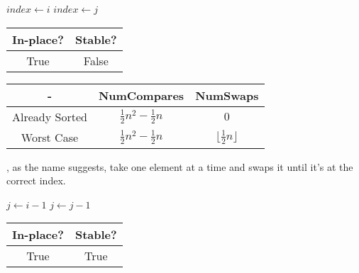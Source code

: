 \noindent \hrulefill
\begin{algorithmic}[1]
   
    \State $index \gets i$
          \State $index \gets j$
        \EndIf
      \EndFor
        \State {} 
      \EndIf
    \EndFor
    \State {}
  \EndFunction
\end{algorithmic}
\noindent \hrulefill

\begin{center}
  \begin{tabular}{ | c | c | }
    \hline
    In-place? & Stable? \\
    \hline
    True & False \\
    \hline
  \end{tabular}
\end{center}

\begin{center}
  \begin{tabular}{ | c | c | c | }
    \hline
    - & NumCompares & NumSwaps \\
    \hline
    Already Sorted & $\frac{1}{2} n^2 - \frac{1}{2} n$ & $0$ \\
    \hline
    Worst Case &  $\frac{1}{2} n^2 - \frac{1}{2} n$ & $\lfloor \frac{1}{2} n \rfloor$ \\
    \hline
  \end{tabular}
\end{center}

, as the name suggests, take one element at a time and swaps it until it's at the correct index.

\noindent \hrulefill
\begin{algorithmic}[1]
   
      \State $j \gets i - 1$
      \State {} 
        \State $j \gets j - 1$
      \EndWhile
    \EndFor
    \State {}
  \EndFunction
\end{algorithmic}
\noindent \hrulefill

\begin{center}
  \begin{tabular}{ | c | c | }
    \hline
    In-place? & Stable? \\
    \hline
    True & True \\
    \hline
  \end{tabular}
\end{center}

